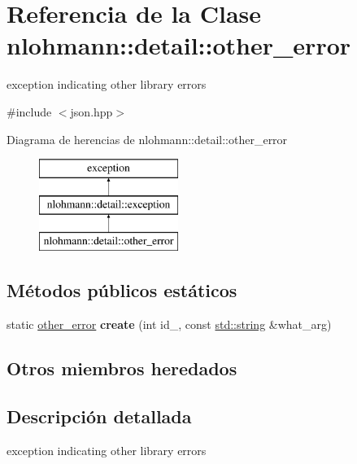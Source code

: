 \hypertarget{classnlohmann_1_1detail_1_1other__error}{}\section{Referencia de la Clase nlohmann\+:\+:detail\+:\+:other\+\_\+error}
\label{classnlohmann_1_1detail_1_1other__error}


exception indicating other library errors  




{\ttfamily \#include $<$json.\+hpp$>$}

Diagrama de herencias de nlohmann\+:\+:detail\+:\+:other\+\_\+error\begin{figure}[H]
\begin{center}
\leavevmode
\includegraphics[height=3.000000cm]{classnlohmann_1_1detail_1_1other__error}
\end{center}
\end{figure}
\subsection*{Métodos públicos estáticos}
\begin{DoxyCompactItemize}
\item 
\mbox{\label{classnlohmann_1_1detail_1_1other__error_a87e8ab894e8c85c0d97a0919782d3683}} 
static \mbox{\hyperlink{classnlohmann_1_1detail_1_1other__error}{other\+\_\+error}} {\bfseries create} (int id\+\_\+, const \mbox{\hyperlink{namespacenlohmann_1_1detail_a1ed8fc6239da25abcaf681d30ace4985ab45cffe084dd3d20d928bee85e7b0f21}{std\+::string}} \&what\+\_\+arg)
\end{DoxyCompactItemize}
\subsection*{Otros miembros heredados}


\subsection{Descripción detallada}
exception indicating other library errors 

